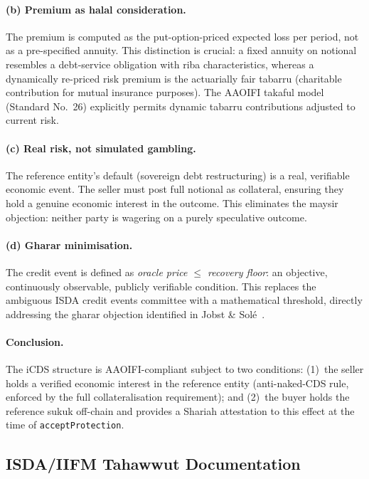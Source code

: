 \documentclass[12pt]{article}
\theoremstyle{plain}
\theoremstyle{definition}
\theoremstyle{remark}
\begin{document}
\paragraph{(b) Premium as halal consideration.}
The premium is computed as the put-option-priced expected loss per period,
not as a pre-specified annuity.
This distinction is crucial: a fixed annuity on notional resembles a
debt-service obligation with riba characteristics, whereas a dynamically
re-priced risk premium is the actuarially fair tabarru (charitable
contribution for mutual insurance purposes).
The AAOIFI takaful model (Standard No.~26) explicitly permits dynamic
tabarru contributions adjusted to current risk.

\paragraph{(c) Real risk, not simulated gambling.}
The reference entity's default (sovereign debt restructuring) is a real,
verifiable economic event.
The seller must post full notional as collateral, ensuring they hold a
genuine economic interest in the outcome.
This eliminates the maysir objection: neither party is wagering on a purely
speculative outcome.

\paragraph{(d) Gharar minimisation.}
The credit event is defined as \emph{oracle price $\leq$ recovery floor}:
an objective, continuously observable, publicly verifiable condition.
This replaces the ambiguous ISDA credit events committee with a
mathematical threshold, directly addressing the gharar objection identified
in Jobst \& Sol\'{e}~\cite{JobstSole2012}.

\paragraph{Conclusion.}
The iCDS structure is AAOIFI-compliant subject to two conditions:
(1)~the seller holds a verified economic interest in the reference entity
(anti-naked-CDS rule, enforced by the full collateralisation requirement);
and (2)~the buyer holds the reference sukuk off-chain and provides a Shariah
attestation to this effect at the time of \texttt{acceptProtection}.

\subsection{ISDA/IIFM Tahawwut Documentation}
\end{document}
